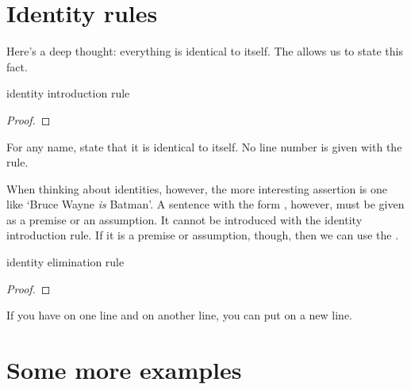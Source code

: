 
\section{Identity rules}

Here's a deep thought: everything is identical to itself. The  allows us to state this fact.

\begin{factboxy}{identity introduction rule}
\begin{proof}
	 \ii{}
\end{proof}

\small{For any name, state that it is identical to itself. No line number is given with the rule.}
\end{factboxy}

When thinking about identities, however, the more interesting assertion is one like `Bruce Wayne \textit{is} Batman'. A sentence with the form , however, must be given as a premise or an assumption. It cannot be introduced with the identity introduction rule. If it is a premise or assumption, though, then we can use the .  

\begin{factboxy}{identity elimination rule}
\begin{proof}
	 
\end{proof}

\small{If you have  on one line and  on another line, you can put  on a new line.}
\end{factboxy}




\section{Some more examples}


